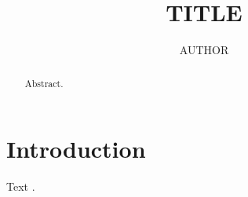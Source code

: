 \documentclass[manuscript,screen,review]{acmart}
\begin{document}
\title{{{TITLE}}}
\author{{{AUTHOR}}}
\begin{abstract}
Abstract.
\end{abstract}
\maketitle
\section{Introduction}
Text \cite{example2024}.


\end{document}
